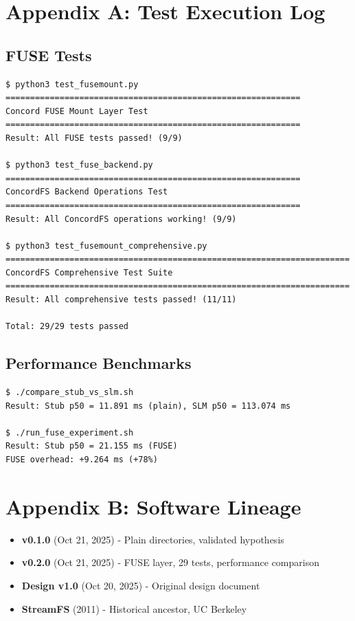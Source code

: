 \documentclass[11pt]{article}
\begin{document}
\appendix

\section{Appendix A: Test Execution Log}

\subsection{FUSE Tests}
\begin{lstlisting}
$ python3 test_fusemount.py
============================================================
Concord FUSE Mount Layer Test
============================================================
Result: All FUSE tests passed! (9/9)

$ python3 test_fuse_backend.py
============================================================
ConcordFS Backend Operations Test
============================================================
Result: All ConcordFS operations working! (9/9)

$ python3 test_fusemount_comprehensive.py
======================================================================
ConcordFS Comprehensive Test Suite
======================================================================
Result: All comprehensive tests passed! (11/11)

Total: 29/29 tests passed
\end{lstlisting}

\subsection{Performance Benchmarks}
\begin{lstlisting}
$ ./compare_stub_vs_slm.sh
Result: Stub p50 = 11.891 ms (plain), SLM p50 = 113.074 ms

$ ./run_fuse_experiment.sh
Result: Stub p50 = 21.155 ms (FUSE)
FUSE overhead: +9.264 ms (+78%)
\end{lstlisting}

\section{Appendix B: Software Lineage}

\begin{itemize}
\item \textbf{v0.1.0} (Oct 21, 2025) - Plain directories, validated hypothesis
\item \textbf{v0.2.0} (Oct 21, 2025) - FUSE layer, 29 tests, performance comparison
\item \textbf{Design v1.0} (Oct 20, 2025) - Original design document
\item \textbf{StreamFS} (2011) - Historical ancestor, UC Berkeley
\end{itemize}
\end{document}
